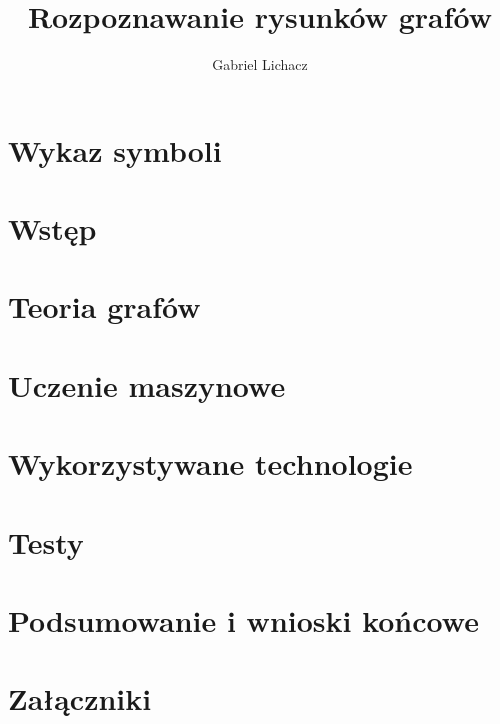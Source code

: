 \documentclass[12pt,twoside]{article}
\author{Gabriel Lichacz}
\title{Rozpoznawanie rysunków grafów}
\begin{document}
\maketitle

\blankpage

\tableofcontents

\clearpage
\blankpage

\section*{Wykaz symboli}

\clearpage

\section{Wstęp}


\section{Teoria grafów}


\section{Uczenie maszynowe}


\section{Wykorzystywane technologie}


\section{Testy}


\section{Podsumowanie i wnioski końcowe}


\clearpage

\section*{Załączniki}


\clearpage



\clearpage

\makesummary
\end{document}
